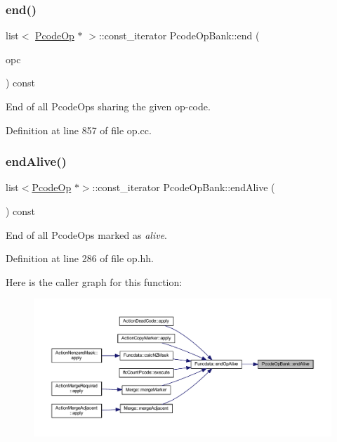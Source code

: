 \subsubsection{\texorpdfstring{end()}{end()}\hspace{0.1cm}{\footnotesize\ttfamily [2/2]}}
{\footnotesize\ttfamily list$<$ \mbox{\hyperlink{class_pcode_op}{Pcode\+Op}} $\ast$ $>$\+::const\+\_\+iterator Pcode\+Op\+Bank\+::end (\begin{DoxyParamCaption}\item[{\mbox{\hyperlink{opcodes_8hh_abeb7dfb0e9e2b3114e240a405d046ea7}{Op\+Code}}}]{opc }\end{DoxyParamCaption}) const}



End of all Pcode\+Ops sharing the given op-\/code. 



Definition at line 857 of file op.\+cc.

\mbox{\label{class_pcode_op_bank_a4aa1fc23069148cd4004c5217d9ffaff}} 
\subsubsection{\texorpdfstring{endAlive()}{endAlive()}}
{\footnotesize\ttfamily list$<$\mbox{\hyperlink{class_pcode_op}{Pcode\+Op}} $\ast$$>$\+::const\+\_\+iterator Pcode\+Op\+Bank\+::end\+Alive (\begin{DoxyParamCaption}\item[{void}]{ }\end{DoxyParamCaption}) const\hspace{0.3cm}{\ttfamily [inline]}}



End of all Pcode\+Ops marked as {\itshape alive}. 



Definition at line 286 of file op.\+hh.

Here is the caller graph for this function\+:
\nopagebreak
\begin{figure}[H]
\begin{center}
\leavevmode
\includegraphics[width=350pt]{class_pcode_op_bank_a4aa1fc23069148cd4004c5217d9ffaff_icgraph}
\end{center}
\end{figure}
\mbox{\label{class_pcode_op_bank_aa651dcad6047a32b0e46423f96c80016}} 

